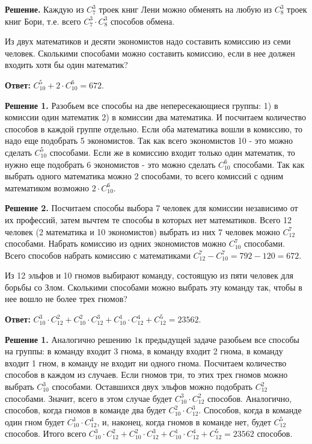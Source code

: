 \textbf{Решение.} Каждую из $C_7^3$ троек книг Лени можно обменять на любую из $C_8^3$ троек книг Бори, т.е. всего $C_7^3 \cdot C_8^3$ способов обмена.

Из двух математиков и десяти экономистов надо составить комиссию из семи человек. Сколькими способами можно составить комиссию, если в нее должен входить хотя бы один математик?

\textbf{Ответ:} $C_{10}^5+2 \cdot C_{10}^6=672$.

\textbf{Решение 1.}
Разобьем все способы на две непересекающиеся группы: 1) в комиссии один математик 2) в комиссии два математика. И посчитаем количество способов в каждой группе отдельно. Если оба математика вошли в комиссию, то надо еще подобрать 5 экономистов. Так как всего экономистов 10 - это можно сделать $C_{10}^5$ способами. Если же в комиссию входит только один математик, то нужно еще подобрать 6 экономистов - это можно сделать $C_{10}^6$ способами. Так как выбрать одного математика можно 2 способами, то всего комиссий с одним математиком возможно $2 \cdot C_{10}^6$.

\textbf{Решение 2.}
Посчитаем способы выбора 7 человек для комиссии независимо от их профессий, затем вычтем те способы в которых нет математиков. Всего 12 человек (2 математика и 10 экономистов) выбрать из них 7 человек можно $C_{12}^7$ способами. Набрать комиссию из одних экономистов можно $C_{10}^7$ способами. Всего способов набрать комиссию с математиками $C_{12}^7-C_{10}^7= 792-120=672$.

Из 12 эльфов и 10 гномов выбирают команду, состоящую из пяти человек для борьбы со Злом. Сколькими способами можно выбрать эту команду так, чтобы в нее вошло не более трех гномов?

\textbf{Ответ:}
$C_{10}^3 \cdot C_{12}^2+C_{10}^2 \cdot C_{12}^3+C_{10}^1 \cdot C_{12}^4+C_{12}^5=23562$.

\textbf{Решение 1.}
Аналогично решению $1 к$ предыдущей задаче разобьем все способы на группы: в команду входит 3 гнома, в команду входит 2 гнома, в команду входит 1 гном, в команду не входит ни одного гнома.
Посчитаем количество способов в каждом из случаев.
Если гномов три, то этих трех гномов можно выбрать $C_{10}^3$ способами. Оставшихся двух эльфов можно подобрать $C_{12}^2$ способами. Значит, всего в этом случае будет $C_{10}^3 \cdot C_{12}^2$ способов.
Аналогично, способов, когда гномов в команде два будет $C_{10}^2 \cdot C_{12}^3$. Способов, когда в команде один гном будет $C_{10}^1 \cdot C_{12}^4$, и, наконец, когда гномов в команде нет, будет $C_{12}^5$ способов. Итого всего $C_{10}^3 \cdot C_{12}^2+C_{10}^2 \cdot C_{12}^3+C_{10}^1 \cdot C_{12}^4+C_{12}^5=23562$ способов.

